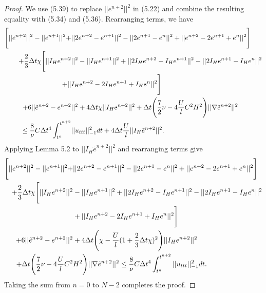 \documentclass[11pt,a4paper]{article}
\begin{document}
\begin{proof}
    We use (5.39) to replace $||e^{n+2}||^2$ in (5.22) and combine the resulting equality with (5.34) and (5.36). Rearranging terms, we have
    \begin{align}
        \Bigg[||e^{n+2}||^2-||e^{n+1}||^2+&||2e^{n+2}-e^{n+1}||^2-||2e^{n+1}-e^n||^2+||e^{n+2}-2e^{n+1}+e^n||^2\Bigg] \notag  \\
        +\frac{2}{3}\Delta t\chi \Bigg[||I_He^{n+2}&||^2 - ||I_He^{n+1}||^2 + ||2I_He^{n+2}-I_He^{n+1}||^2 - ||2I_He^{n+1}-I_He^n||^2 \notag \\
        +||&I_He^{n+2}-2I_He^{n+1}+I_He^n||^2\Bigg]  \\
        +6||\Tilde{e}^{n+2}-e^{n+2}&||^2 +4\Delta t\chi ||I_He^{n+2}||^2 +\Delta t\Bigg(\frac{7}{2}\nu -4\frac{U}{l}C^2H^2\Bigg) ||\nabla \Tilde{e}^{n+2}||^2 \notag \\
        \leq \frac{8}{\nu}C\Delta t^4\int_{t^n}^{t^{n+2}}&||u_{ttt}||_{-1}^2dt + 4\Delta t\frac{U}{l}||I_H\tilde{e}^{n+2}||^2. \notag
    \end{align}
    Applying Lemma 5.2 to $||I_H\tilde{e}^{n+2}||^2$ and rearranging terms give
    \begin{align}
        \Bigg[||e^{n+2}||^2-||e^{n+1}||^2+&||2e^{n+2}-e^{n+1}||^2-||2e^{n+1}-e^n||^2+||e^{n+2}-2e^{n+1}+e^n||^2\Bigg] \notag  \\
        +\frac{2}{3}\Delta t\chi \Bigg[ ||I_He^{n+2}||^2& - ||I_He^{n+1}||^2 + ||2I_He^{n+2}-I_He^{n+1}||^2 - ||2I_He^{n+1}-I_He^n||^2 \notag \\
        &+||I_He^{n+2}-2I_He^{n+1}+I_He^n||^2\Bigg]  \\
        +6||\Tilde{e}^{n+2}-e^{n+2}||^2 &+4\Delta t\Bigg(\chi-\frac{U}{l}(1+\frac{2}{3}\Delta t \chi)^2\Bigg)||I_He^{n+2}||^2 \notag \\
        +\Delta t\Bigg(\frac{7}{2}\nu -4\frac{U}{l}C^2&H^2\Bigg) ||\nabla \Tilde{e}^{n+2}||^2 \leq \frac{8}{\nu}C\Delta t^4\int_{t^n}^{t^{n+2}}||u_{ttt}||_{-1}^2dt. \notag
    \end{align}
    Taking the sum from $n = 0$ to $N-2$ completes the proof.
\end{proof}
\end{document}
